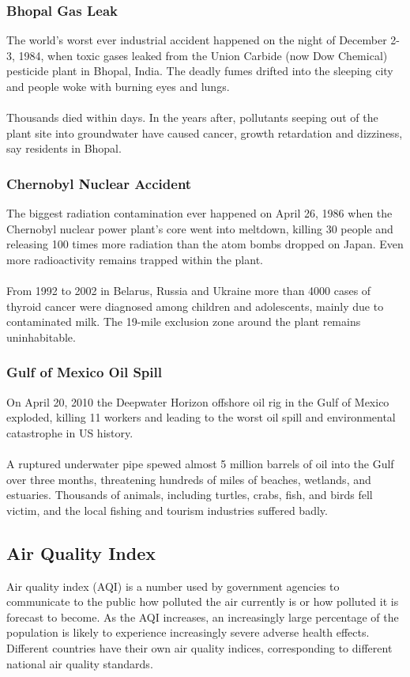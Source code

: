 \subsubsection{Bhopal Gas Leak}
The world’s worst ever industrial accident happened on the night of December 2-3, 1984, when toxic gases leaked from the Union Carbide (now Dow Chemical) pesticide plant in Bhopal, India. The deadly fumes drifted into the sleeping city and people woke with burning eyes and lungs.
\\
\\
Thousands died within days. In the years after, pollutants seeping out of the plant site into groundwater have caused cancer, growth retardation and dizziness, say residents in Bhopal.

\subsubsection{Chernobyl Nuclear Accident}
The biggest radiation contamination ever happened on April 26, 1986 when the Chernobyl nuclear power plant’s core went into meltdown, killing 30 people and releasing 100 times more radiation than the atom bombs dropped on Japan. Even more radioactivity remains trapped within the plant.
\\
\\
From 1992 to 2002 in Belarus, Russia and Ukraine more than 4000 cases of thyroid cancer were diagnosed among children and adolescents, mainly due to contaminated milk. The 19-mile exclusion zone around the plant remains uninhabitable.

\subsubsection{Gulf of Mexico Oil Spill}
On April 20, 2010 the Deepwater Horizon offshore oil rig in the Gulf of Mexico exploded, killing 11 workers and leading to the worst oil spill and environmental catastrophe in US history.
\\
\\
A ruptured underwater pipe spewed almost 5 million barrels of oil into the Gulf over three months, threatening hundreds of miles of beaches, wetlands, and estuaries. Thousands of animals, including turtles, crabs, fish, and birds fell victim, and the local fishing and tourism industries suffered badly.

\subsection{Air Quality Index}
Air quality index (AQI) is a number used by government agencies  to communicate to the public how polluted the air currently is or how polluted it is forecast to become. As the AQI increases, an increasingly large percentage of the population is likely to experience increasingly severe adverse health effects. Different countries have their own air quality indices, corresponding to different national air quality standards.

